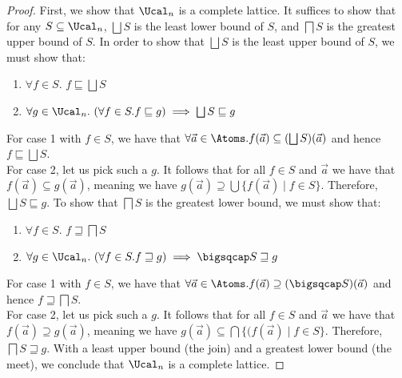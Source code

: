 \completelattice*
\begin{proof}
	First, we show that $\Ucal_n$ is a complete lattice. 
	It suffices to show that for any $S\subseteq \Ucal_n$, $\bigsqcup S$ is the least lower bound of $S$, and $\bigsqcap S$ is the greatest upper bound of $S$. In order to show that $\bigsqcup S$ is the least upper bound of $S$, we must show that:
 \begin{enumerate}
		\item $\forall f\in S$. $f\sqsubseteq \bigsqcup S$
		\item $\forall g\in \Ucal_n.\ (\forall f\in S. f\sqsubseteq g)\implies\bigsqcup S \sqsubseteq g$
	\end{enumerate}
 	For case 1 with $f\in S$, we have that $\forall \vec a\in\Atoms. f(\vec a) \subseteq (\bigsqcup S)(\vec a)$
	and hence $f\sqsubseteq \bigsqcup S$.\\
  	For case 2, let us pick such a $g$. It follows that for all $f\in S$ and $\vec a$ we have that $f(\vec a) \subseteq g(\vec a)$,
	meaning we have $g(\vec a) \supseteq \bigcup \{f(\vec a) \mid f \in S\}$.
	Therefore, $\bigsqcup S \sqsubseteq g$.
	To show that $\bigsqcap S$ is the greatest lower bound, we must show that:
	\begin{enumerate}
		\item $\forall f\in S$. $f\sqsupseteq \bigsqcap S$
		\item $\forall g\in \Ucal_n.\ (\forall f\in S. f\sqsupseteq g)\implies\bigsqcap S \sqsupseteq g$
	\end{enumerate}
	For case 1 with $f\in S$, we have that $\forall \vec a\in\Atoms. f(\vec a)\supseteq (\bigsqcap S)(\vec a)$ and hence $f\sqsupseteq \bigsqcap S$.\\
	For case 2, let us pick such a $g$. It follows that for all $f \in S$ and $\vec a$ we have that $f(\vec a)\supseteq g(\vec a)$, meaning we have $g(\vec a) \subseteq \bigcap\{(f(\vec a)\mid f \in S\}$. Therefore, $\bigsqcap S \sqsupseteq g$.     
	With a least upper bound (the join) and a greatest lower bound (the meet), we conclude that $\Ucal_n$ is a complete lattice. 
	

\end{proof}
